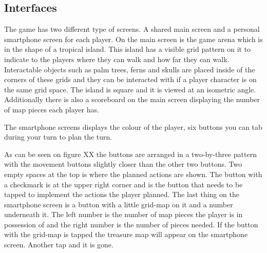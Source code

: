 \subsection{Interfaces}
The game has two different type of screens. A shared main screen and a personal smartphone screen for each player. 
On the main screen is the game arena which is in the shape of a tropical island. This island has a visible grid pattern on it to indicate to the players where they can walk and how far they can walk. Interactable objects such as palm trees, ferns and skulls are placed inside of the corners of these grids and they can be interacted with if a player character is on the same grid space. The island is square and it is viewed at an isometric angle. Additionally there is also a scoreboard on the main screen displaying the number of map pieces each player has.

The smartphone screens displays the colour of the player, six buttons you can tab during your turn to plan the turn. 


As can be seen on figure XX the buttons are arranged in a two-by-three pattern with the movement buttons slightly closer than the other two buttons. Two empty spaces at the top is where the planned actions are shown. The button with a checkmark is at the upper right corner and is the button that needs to be tapped to implement the actions the player planned. The last thing on the smartphone screen is a button with a little grid-map on it and a number underneath it. The left number is the number of map pieces the player is in possession of and the right number is the number of pieces needed. If the button with the grid-map is tapped the treasure map will appear on the smartphone screen. Another tap and it is gone. 

